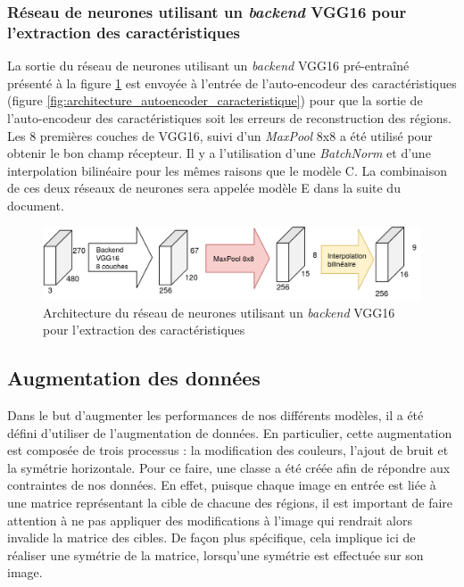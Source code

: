 \subsubsection{Réseau de neurones utilisant un \textit{backend} VGG16 pour l'extraction des caractéristiques}
    La sortie du réseau de neurones utilisant un \textit{backend} VGG16 pré-entraîné présenté à la figure \ref{fig:architecture_vgg16} est envoyée à l'entrée de l'auto-encodeur des caractéristiques (figure \ref{fig:architecture_autoencoder_caracteristique}) pour que la sortie de l'auto-encodeur des caractéristiques soit les erreurs de reconstruction des régions. Les 8 premières couches de VGG16, suivi d'un \textit{MaxPool} 8x8 a été utilisé pour obtenir le bon champ récepteur. Il y a l'utilisation d'une \textit{BatchNorm} et d'une interpolation bilinéaire pour les mêmes raisons que le modèle C. La combinaison de ces deux réseaux de neurones sera appelée modèle E dans la suite du document.
    \begin{figure}
        \centering
        \includegraphics[width=15cm]{images/Architecture_Vgg16BackendAutoencoder.png}
        \caption{Architecture du réseau de neurones utilisant un \textit{backend} VGG16 pour l'extraction des caractéristiques}
        \label{fig:architecture_vgg16}
    \end{figure}

\subsection{Augmentation des données}
    Dans le but d'augmenter les performances de nos différents modèles, il a été défini d'utiliser de l'augmentation de données. En particulier, cette augmentation est composée de trois processus : la modification des couleurs, l'ajout de bruit et la symétrie horizontale. Pour ce faire, une classe a été créée afin de répondre aux contraintes de nos données. En effet, puisque chaque image en entrée est liée à une matrice représentant la cible de chacune des régions, il est important de faire attention à ne pas appliquer des modifications à l'image qui rendrait alors invalide la matrice des cibles. De façon plus spécifique, cela implique ici de réaliser une symétrie de la matrice, lorsqu'une symétrie est effectuée sur son image.\\
    
